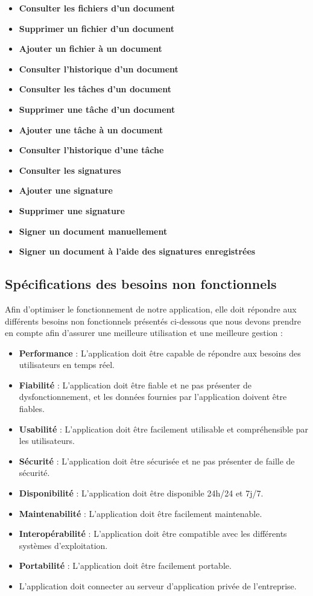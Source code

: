 \begin{itemize}
\item \textbf{Consulter les fichiers d'un document}
\item \textbf{Supprimer un fichier d'un document}
\item \textbf{Ajouter un fichier à un document}
\item \textbf{Consulter l'historique d'un document}
\item \textbf{Consulter les tâches d'un document}
\item \textbf{Supprimer une tâche d'un document}
\item \textbf{Ajouter une tâche à un document}
\item \textbf{Consulter l'historique d'une tâche}
\item \textbf{Consulter les signatures}
\item \textbf{Ajouter une signature}
\item \textbf{Supprimer une signature}
\item \textbf{Signer un document manuellement}
\item \textbf{Signer un document à l'aide des signatures enregistrées}

\end{itemize}

\subsection{Spécifications des besoins non fonctionnels}
Afin d'optimiser le fonctionnement de notre application, elle doit répondre aux différents besoins non fonctionnels présentés ci-dessous que nous devons prendre en compte afin d'assurer une meilleure utilisation et une meilleure gestion :

\begin{itemize}
\item \textbf{Performance} : L'application doit être capable de répondre aux besoins des utilisateurs en temps réel.
\item \textbf{Fiabilité} : L'application doit être fiable et ne pas présenter de dysfonctionnement, et les données fournies par l'application doivent être fiables.
\item \textbf{Usabilité} : L'application doit être facilement utilisable et compréhensible par les utilisateurs.
\item \textbf{Sécurité} : L'application doit être sécurisée et ne pas présenter de faille de sécurité.
\item \textbf{Disponibilité} : L'application doit être disponible 24h/24 et 7j/7.
\item \textbf{Maintenabilité} : L'application doit être facilement maintenable.
\item \textbf{Interopérabilité} : L'application doit être compatible avec les différents systèmes d'exploitation.
\item \textbf{Portabilité} : L'application doit être facilement portable.
\item L'application doit connecter au serveur d'application privée de l'entreprise.
\end{itemize}

